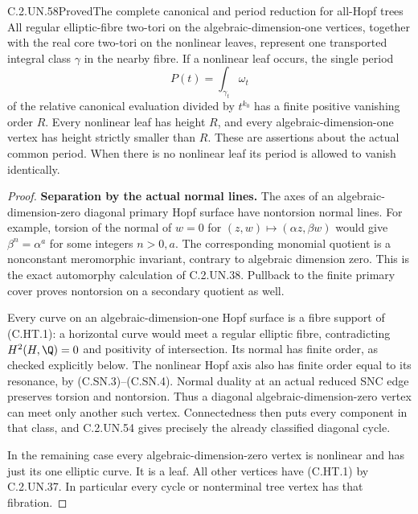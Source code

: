 \begin{statement}{C.2.UN.58}{Proved}{The complete canonical and period reduction for all-Hopf trees}
All regular elliptic-fibre two-tori on the algebraic-dimension-one
vertices, together with the real core two-tori on the nonlinear
leaves, represent one transported integral class $\gamma$ in the
nearby fibre. If a nonlinear leaf occurs, the single period
\[
                     P(t)=\int_{\gamma_t}\omega_t       \tag{C.HT.3}
\]
of the relative canonical evaluation divided by $t^{k_0}$ has a
finite positive vanishing order $R$. Every nonlinear leaf has
height $R$, and every algebraic-dimension-one vertex has height
strictly smaller than $R$. These are assertions about the actual
common period. When there is no nonlinear leaf its period is
allowed to vanish identically.
\end{statement}

\begin{proof}
\par\medskip\noindent\textbf{Separation by the actual normal lines.}
The axes of an algebraic-dimension-zero diagonal primary Hopf
surface have nontorsion normal lines. For example, torsion of the
normal of $w=0$ for $(z,w)\mapsto(\alpha z,\beta w)$ would give
$\beta^n=\alpha^a$ for some integers $n>0,a$. The corresponding
monomial quotient is a nonconstant meromorphic invariant, contrary
to algebraic dimension zero. This is the exact automorphy
calculation of C.2.UN.38. Pullback to the finite primary cover
proves nontorsion on a secondary quotient as well.

Every curve on an algebraic-dimension-one Hopf surface is a fibre
support of (C.HT.1): a horizontal curve would meet a regular elliptic
fibre, contradicting $H^2(H,\Q)=0$ and positivity of intersection.
Its normal has finite order, as checked explicitly below. The
nonlinear Hopf axis also has finite order equal to its resonance,
by (C.SN.3)--(C.SN.4). Normal duality at an actual reduced SNC edge
preserves torsion and nontorsion. Thus a diagonal
algebraic-dimension-zero vertex can meet only another such vertex.
Connectedness then puts every component in that class, and
C.2.UN.54 gives precisely the already classified diagonal cycle.

In the remaining case every algebraic-dimension-zero vertex is
nonlinear and has just its one elliptic curve. It is a leaf.
All other vertices have (C.HT.1) by C.2.UN.37. In particular every
cycle or nonterminal tree vertex has that fibration.


\end{proof}
